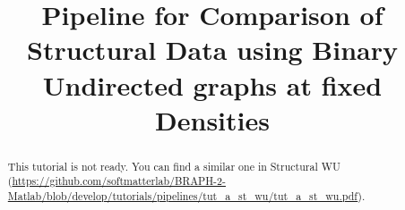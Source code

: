 \documentclass[justified]{tufte-handout}
\title{Pipeline for Comparison of Structural Data using Binary Undirected graphs at fixed Densities}
\begin{document}
\maketitle

\begin{abstract}
\noindent
This tutorial is not ready. You can find a similar one in Structural WU (\url{https://github.com/softmatterlab/BRAPH-2-Matlab/blob/develop/tutorials/pipelines/tut_a_st_wu/tut_a_st_wu.pdf}).
\end{abstract}
\end{document}
